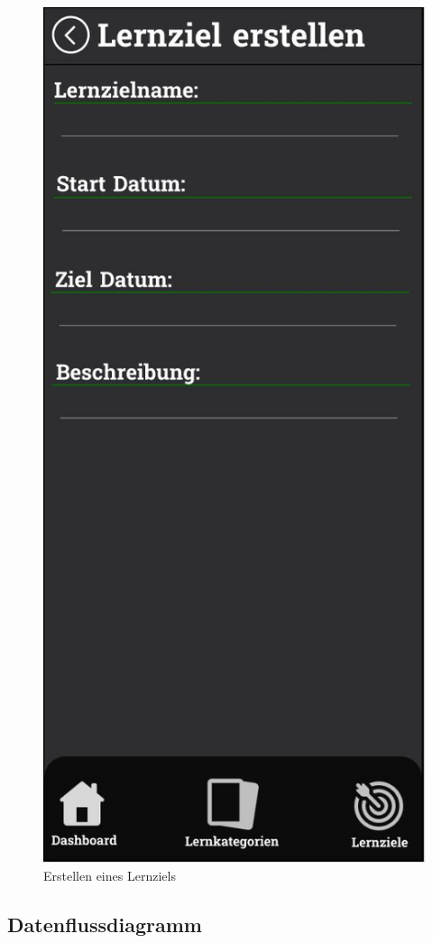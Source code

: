     \newpage

    \begin{figure}[H]
        \centering
        \includegraphics[width=0.5\linewidth]{images/Mockups/LernzielErstellen.JPG}
        \caption{Erstellen eines Lernziels}
        \label{fig:lernziel-erstellen}
      \end{figure}

    \newpage
      
    
    \subsection{Datenflussdiagramm}


